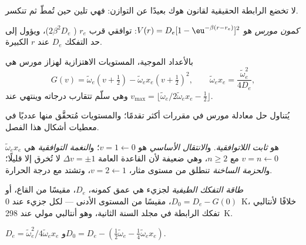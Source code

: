 لا تخضع الرابطة الحقيقية لقانون هوك بعيدًا عن التوازن: فهي تلين حين
تُمطّ ثم تنكسر.

\begin{definition}\label{def:b3:rovibrational-spectroscopy:morse}
\emph{كمون مورس} هو $V(r) = D_e[1 -
\eu^{-\beta(r - r_e)}]^2$: توافقي قرب $r_e$ ( $2\beta^2D_e$)، 
ويؤول إلى حد التفكك $D_e$ عند $r$ الكبيرة.
\end{definition}

\begin{proposition}\label{prop:b3:rovibrational-spectroscopy:morse-levels}
بالأعداد الموجية، المستويات الاهتزازية لهزاز مورس هي
\[
G(v) = \tilde\omega_e(v + \tfrac12) - \tilde\omega_ex_e(v + \tfrac12)^2, \qquad
\tilde\omega_ex_e = \frac{\tilde\omega_e^2}{4D_e},
\]
وهي سلّم تتقارب درجاته وينتهي عند $v_{\max} = \lfloor\tilde\omega_e/
2\tilde\omega_ex_e - \frac12\rfloor$.
\end{proposition}
\admitted

يُتناول حل معادلة مورس في مقررات أكثر تقدمًا؛ 
والمستويات مُتحقَّق منها عدديًا في معطيات أشكال هذا الفصل.

\begin{definition}\label{def:b3:rovibrational-spectroscopy:anharmonic}
$\tilde\omega_ex_e$ هو \emph{ثابت اللاتوافقية}.
و\emph{الانتقال الأساسي}
هو $v = 1 \leftarrow 0$؛ و\emph{النغمة التوافقية} هي $v = n \leftarrow 0$
مع $n \ge 2$، وهي ضعيفة لأن القاعدة العامة $\Delta v = \pm1$  لا تُخرق إلا قليلًا؛ و\emph{الحزمة الساخنة} تنطلق
من مستوى مثار، $v = 2 \leftarrow 1$، وتشتد مع درجة الحرارة.
\end{definition}

\begin{definition}\label{def:b3:rovibrational-spectroscopy:dissociation}
\emph{طاقة التفكك الطيفية}
لجزيء هي عمق كمونه، $D_e$، مقيسًا من
القاع، أو $D_0 = D_e - G(0)$، مقيسًا من المستوى الأدنى --- لكل
جزيء عند \qty{0}{K}، خلافًا لأنتالبي تفكك الرابطة في مجلد السنة
الثانية، وهو أنتالبي مولي عند \qty{298}{K}.
\end{definition}

\begin{corollary}\label{cor:b3:rovibrational-spectroscopy:de}
$D_e = \tilde\omega_e^2/4\tilde\omega_ex_e$ و$D_0 = D_e - (\frac12\tilde\omega_e -
\frac14\tilde\omega_ex_e)$.
\end{corollary}

